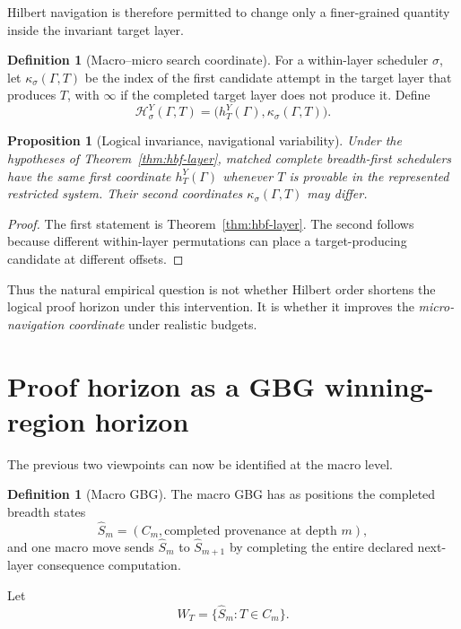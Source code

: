 \documentclass[11pt]{article}
\newtheorem{proposition}[theorem]{Proposition}
\theoremstyle{definition}
\newtheorem{definition}[theorem]{Definition}
\begin{document}
Hilbert navigation is therefore permitted to change only a finer-grained quantity inside the invariant target layer.

\begin{definition}[Macro--micro search coordinate]\label{def:macro-micro}
For a within-layer scheduler $\sigma$, let $\kappa_\sigma(\Gamma,T)$ be the index of the first candidate attempt in the target layer that produces $T$, with $\infty$ if the completed target layer does not produce it. Define
\[
\mathcal H_\sigma^Y(\Gamma,T)
=
\bigl(h_T^Y(\Gamma),\kappa_\sigma(\Gamma,T)\bigr).
\]
\end{definition}

\begin{proposition}[Logical invariance, navigational variability]\label{prop:macro-micro}
Under the hypotheses of Theorem~\ref{thm:hbf-layer}, matched complete breadth-first schedulers have the same first coordinate $h_T^Y(\Gamma)$ whenever $T$ is provable in the represented restricted system. Their second coordinates $\kappa_\sigma(\Gamma,T)$ may differ.
\end{proposition}

\begin{proof}
The first statement is Theorem~\ref{thm:hbf-layer}. The second follows because different within-layer permutations can place a target-producing candidate at different offsets.
\end{proof}

Thus the natural empirical question is not whether Hilbert order shortens the logical proof horizon under this intervention. It is whether it improves the \emph{micro-navigation coordinate} under realistic budgets.

\section{Proof horizon as a GBG winning-region horizon}

The previous two viewpoints can now be identified at the macro level.

\begin{definition}[Macro GBG]\label{def:macro-gbg}
The macro GBG has as positions the completed breadth states
\[
\widehat S_m=(C_m,\text{completed provenance at depth }m),
\]
and one macro move sends $\widehat S_m$ to $\widehat S_{m+1}$ by completing the entire declared next-layer consequence computation.
\end{definition}

Let
\[
\widehat W_T=\{\widehat S_m:T\in C_m\}.
\]
\end{document}
